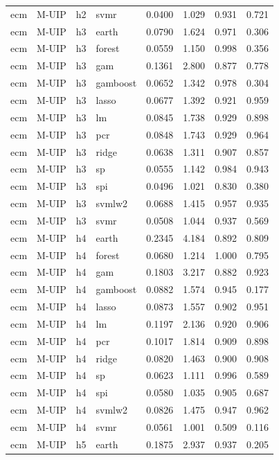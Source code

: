\begin{ThreePartTable}
\begin{longtable}[t]{llclcccc}
ecm & M-UIP & h2 & svmr & 0.0400 & 1.029 & 0.931 & 0.721\\
\addlinespace
ecm & M-UIP & h3 & earth & 0.0790 & 1.624 & 0.971 & 0.306\\
ecm & M-UIP & h3 & forest & 0.0559 & 1.150 & 0.998 & 0.356\\
ecm & M-UIP & h3 & gam & 0.1361 & 2.800 & 0.877 & 0.778\\
ecm & M-UIP & h3 & gamboost & 0.0652 & 1.342 & 0.978 & 0.304\\
ecm & M-UIP & h3 & lasso & 0.0677 & 1.392 & 0.921 & 0.959\\
ecm & M-UIP & h3 & lm & 0.0845 & 1.738 & 0.929 & 0.898\\
ecm & M-UIP & h3 & pcr & 0.0848 & 1.743 & 0.929 & 0.964\\
ecm & M-UIP & h3 & ridge & 0.0638 & 1.311 & 0.907 & 0.857\\
ecm & M-UIP & h3 & sp & 0.0555 & 1.142 & 0.984 & 0.943\\
ecm & M-UIP & h3 & spi & 0.0496 & 1.021 & 0.830 & 0.380\\
ecm & M-UIP & h3 & svmlw2 & 0.0688 & 1.415 & 0.957 & 0.935\\
ecm & M-UIP & h3 & svmr & 0.0508 & 1.044 & 0.937 & 0.569\\
\addlinespace
ecm & M-UIP & h4 & earth & 0.2345 & 4.184 & 0.892 & 0.809\\
ecm & M-UIP & h4 & forest & 0.0680 & 1.214 & 1.000 & 0.795\\
ecm & M-UIP & h4 & gam & 0.1803 & 3.217 & 0.882 & 0.923\\
ecm & M-UIP & h4 & gamboost & 0.0882 & 1.574 & 0.945 & 0.177\\
ecm & M-UIP & h4 & lasso & 0.0873 & 1.557 & 0.902 & 0.951\\
ecm & M-UIP & h4 & lm & 0.1197 & 2.136 & 0.920 & 0.906\\
ecm & M-UIP & h4 & pcr & 0.1017 & 1.814 & 0.909 & 0.898\\
ecm & M-UIP & h4 & ridge & 0.0820 & 1.463 & 0.900 & 0.908\\
ecm & M-UIP & h4 & sp & 0.0623 & 1.111 & 0.996 & 0.589\\
ecm & M-UIP & h4 & spi & 0.0580 & 1.035 & 0.905 & 0.687\\
ecm & M-UIP & h4 & svmlw2 & 0.0826 & 1.475 & 0.947 & 0.962\\
ecm & M-UIP & h4 & svmr & 0.0561 & 1.001 & 0.509 & 0.116\\
\addlinespace
ecm & M-UIP & h5 & earth & 0.1875 & 2.937 & 0.937 & 0.205\\

\end{longtable}
\end{ThreePartTable}
